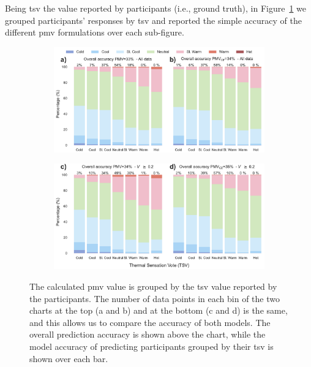 Being \ac{tsv} the value reported by participants (i.e., ground truth), in Figure~\ref{fig:bar_stacked_model_accuracy} we grouped participants' responses by \ac{tsv} and reported the simple accuracy of the different \ac{pmv} formulations over each sub-figure.
\begin{figure}[htb!]
    \centering
    \begin{subfigure}[b]{\textwidth}
        \centering
        \includegraphics[width=\textwidth]{figures/bar_stacked_model_accuracy_0}
    \end{subfigure}
\par\bigskip %
    \begin{subfigure}[b]{\textwidth}
        \centering
        \includegraphics[width=\textwidth]{figures/bar_stacked_model_accuracy_0.2}
    \end{subfigure}
    \caption{The calculated \ac{pmv} value is grouped by the \ac{tsv} value reported by the participants.
    The number of data points in each bin of the two charts at the top (a and b) and at the bottom (c and d) is the same, and this allows us to compare the accuracy of both models.
    The overall prediction accuracy is shown above the chart, while the model accuracy of predicting participants grouped by their \ac{tsv} is shown over each bar.}
    \label{fig:bar_stacked_model_accuracy}
\end{figure}

